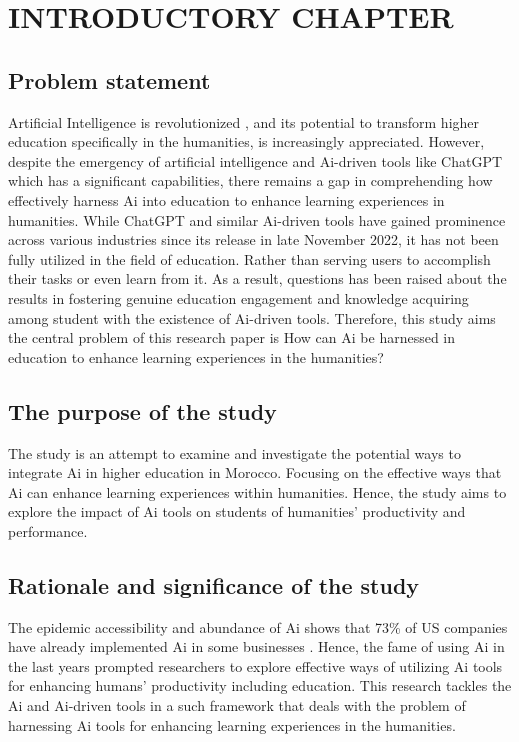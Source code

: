\chapter{INTRODUCTORY CHAPTER}
\section{Problem statement}
\justifying
Artificial Intelligence is revolutionized , and its potential
to transform higher education specifically in the humanities, is increasingly
appreciated. However, despite the emergency of artificial intelligence and
Ai-driven tools like ChatGPT which has a significant capabilities,
there remains a gap in comprehending how effectively harness Ai into
education to enhance learning experiences in humanities. While ChatGPT
and similar Ai-driven tools have gained prominence across various
industries since its release in late November 2022, it has not been
fully utilized in the field of education. Rather than serving users
to accomplish their tasks or even learn from it. As a result, questions
has been raised about the results in fostering genuine education engagement
and knowledge acquiring among student with the existence of Ai-driven tools. Therefore, this study aims
the central problem of this research paper is How can Ai be harnessed
in education to enhance learning experiences in the humanities?
\section{The purpose of the study}
\justifying
The study is an attempt to examine and investigate the potential ways to integrate Ai in higher education in Morocco.
Focusing on the effective ways that Ai can enhance learning experiences within humanities. Hence, the study aims to
explore the impact of Ai tools on students of humanities' productivity and performance.
\section{Rationale and significance of the study}
\justifying
The epidemic accessibility and abundance of Ai shows that 73\% of US companies have already
implemented Ai in some businesses \citep{pricewaterhousecoopers_2024_2024} .
Hence, the fame of using Ai in the last years prompted researchers to explore effective ways of utilizing Ai tools
for enhancing humans' productivity including education. This research tackles the Ai and Ai-driven tools in a such framework that 
deals with the problem of harnessing Ai tools for enhancing learning experiences in the humanities. 

